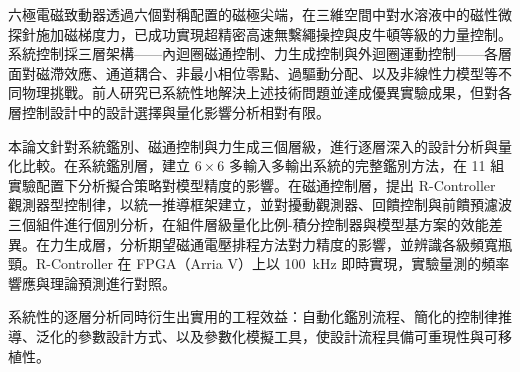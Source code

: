 \begin{abstractzh}
\setcounter{page}{1}

六極電磁致動器透過六個對稱配置的磁極尖端，在三維空間中對水溶液中的磁性微探針施加磁梯度力，已成功實現超精密高速無繫繩操控與皮牛頓等級的力量控制。系統控制採三層架構——內迴圈磁通控制、力生成控制與外迴圈運動控制——各層面對磁滯效應、通道耦合、非最小相位零點、過驅動分配、以及非線性力模型等不同物理挑戰。前人研究已系統性地解決上述技術問題並達成優異實驗成果，但對各層控制設計中的設計選擇與量化影響分析相對有限。

本論文針對系統鑑別、磁通控制與力生成三個層級，進行逐層深入的設計分析與量化比較。在系統鑑別層，建立 $6\times6$ 多輸入多輸出系統的完整鑑別方法，在 11 組實驗配置下分析擬合策略對模型精度的影響。在磁通控制層，提出 R-Controller 觀測器型控制律，以統一推導框架建立，並對擾動觀測器、回饋控制與前饋預濾波三個組件進行個別分析，在組件層級量化比例-積分控制器與模型基方案的效能差異。在力生成層，分析期望磁通電壓排程方法對力精度的影響，並辨識各級頻寬瓶頸。R-Controller 在 FPGA（Arria V）上以 100~kHz 即時實現，實驗量測的頻率響應與理論預測進行對照。

系統性的逐層分析同時衍生出實用的工程效益：自動化鑑別流程、簡化的控制律推導、泛化的參數設計方式、以及參數化模擬工具，使設計流程具備可重現性與可移植性。


\end{abstractzh}


